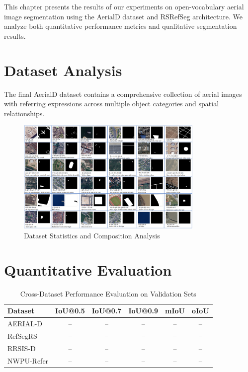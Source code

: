 \cleardoublepage
\label{chap:conclusion}

This chapter presents the results of our experiments on open-vocabulary aerial image segmentation using the AerialD dataset and RSRefSeg architecture. We analyze both quantitative performance metrics and qualitative segmentation results.

\section{Dataset Analysis}

The final AerialD dataset contains a comprehensive collection of aerial images with referring expressions across multiple object categories and spatial relationships.

\begin{figure}[H]
\centering
\includegraphics[width=0.8\textwidth]{./Images/dataset.png}
\caption{Dataset Statistics and Composition Analysis}
\label{fig:dataset_stats}
\end{figure}

\section{Quantitative Evaluation}

\begin{table}[H]
\centering
\caption{Cross-Dataset Performance Evaluation on Validation Sets}
\label{tab:cross_dataset_results}
\begin{tabular}{@{}lccccc@{}}
\toprule
\textbf{Dataset} & \textbf{IoU@0.5} & \textbf{IoU@0.7} & \textbf{IoU@0.9} & \textbf{mIoU} & \textbf{oIoU} \\
\midrule
AERIAL-D & -- & -- & -- & -- & -- \\
RefSegRS & -- & -- & -- & -- & -- \\
RRSIS-D & -- & -- & -- & -- & -- \\
NWPU-Refer & -- & -- & -- & -- & -- \\
\bottomrule
\end{tabular}
\end{table}

